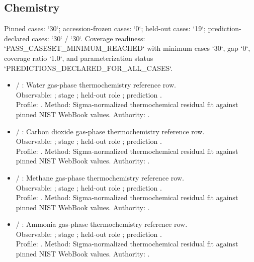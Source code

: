 \subsection{Chemistry}
Pinned cases: `30`; accession-frozen cases: `0`; held-out cases: `19`; prediction-declared cases: `30` / `30`.
Coverage readiness: `PASS\_CASESET\_MINIMUM\_REACHED` with minimum cases `30`, gap `0`, coverage ratio `1.0`, and parameterization status `PREDICTIONS\_DECLARED\_FOR\_ALL\_CASES`.
\begin{itemize}
\item {} / : Water gas-phase thermochemistry reference row.\\ Observable: ; stage ; held-out role ; prediction .\\ Profile: . Method: Sigma-normalized thermochemical residual fit against pinned NIST WebBook values. Authority: .
\item {} / : Carbon dioxide gas-phase thermochemistry reference row.\\ Observable: ; stage ; held-out role ; prediction .\\ Profile: . Method: Sigma-normalized thermochemical residual fit against pinned NIST WebBook values. Authority: .
\item {} / : Methane gas-phase thermochemistry reference row.\\ Observable: ; stage ; held-out role ; prediction .\\ Profile: . Method: Sigma-normalized thermochemical residual fit against pinned NIST WebBook values. Authority: .
\item {} / : Ammonia gas-phase thermochemistry reference row.\\ Observable: ; stage ; held-out role ; prediction .\\ Profile: . Method: Sigma-normalized thermochemical residual fit against pinned NIST WebBook values. Authority: .

\end{itemize}
